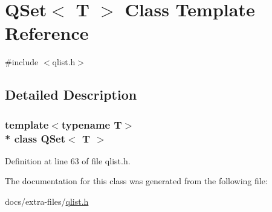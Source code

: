 \hypertarget{class_q_set}{}\section{Q\+Set$<$ T $>$ Class Template Reference}
\label{class_q_set}


{\ttfamily \#include $<$qlist.\+h$>$}



\subsection{Detailed Description}
\subsubsection*{template$<$typename T$>$\\*
class Q\+Set$<$ T $>$}



Definition at line 63 of file qlist.\+h.



The documentation for this class was generated from the following file\+:\begin{DoxyCompactItemize}
\item 
docs/extra-\/files/\hyperlink{qlist_8h}{qlist.\+h}\end{DoxyCompactItemize}
